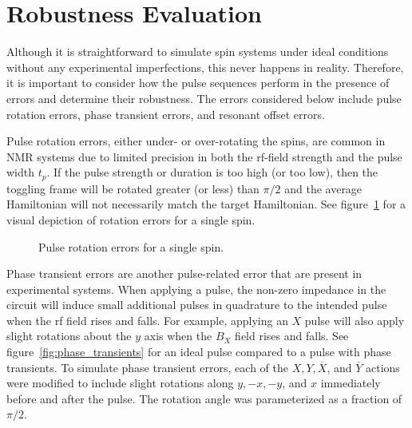 






\section{Robustness Evaluation}

Although it is straightforward to simulate spin systems under ideal conditions without any experimental imperfections, this never happens in reality. Therefore, it is important to consider how the pulse sequences perform in the presence of errors and determine their robustness.
The errors considered below include pulse rotation errors, phase transient errors, and resonant offset errors.

Pulse rotation errors, either under- or over-rotating the spins, are common in NMR systems due to limited precision in both the rf-field strength and the pulse width $t_p$. If the pulse strength or duration is too high (or too low), then the toggling frame will be rotated greater (or less) than $\pi/2$ and the average Hamiltonian will not necessarily match the target Hamiltonian. See figure~\ref{fig:rotation-error} for a visual depiction of rotation errors for a single spin.

\begin{figure}[H]
    \centering
    
    \caption{Pulse rotation errors for a single spin.}
    \label{fig:rotation-error}
\end{figure}

Phase transient errors are another pulse-related error that are present in experimental systems. When applying a pulse, the non-zero impedance in the circuit will induce small additional pulses in quadrature to the intended pulse when the rf field rises and falls. For example, applying an $X$ pulse will also apply slight rotations about the $y$ axis when the $B_X$ field rises and falls. See figure~\ref{fig:phase_transients} for an ideal pulse compared to a pulse with phase transients. To simulate phase transient errors, each of the $X, Y, \overline{X}$, and $\overline{Y}$ actions were modified to include slight rotations along $y, -x, -y$, and $x$ immediately before and after the pulse. The rotation angle was parameterized as a fraction of $\pi/2$.

